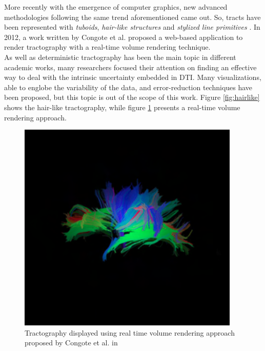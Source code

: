 \documentclass{article}
\begin{document}
\begin{multicols}{2}
More recently with the emergence of computer graphics, new advanced methodologies following the same trend aforementioned came out. So, tracts have been represented with \textit{tuboids}\cite{petrovic2007visualizing}, \textit{hair-like structures} \cite{peeters2006visualization} and \textit{stylized line primitives} \cite{stoll2005visualization}. In 2012, a work written by Congote et al. proposed a web-based application to render tractography \cite{congote2012real} with a real-time volume rendering technique. \\
As well as deterministic tractography has been the main topic in different academic works, many researchers focused their attention on finding an effective way to deal with the intrinsic uncertainty embedded in DTI. Many visualizations, able to englobe the variability of the data, and error-reduction techniques have been proposed, but this topic is out of the scope of this work. Figure \ref{fig:hairlike} shows the hair-like tractography, while figure \ref{gig:realtime} presents a real-time volume rendering approach.


\begin{figure}[H]
\centering
\includegraphics[width = 0.8\columnwidth]{realTimeTractography}
\caption{Tractography displayed using real time volume rendering approach proposed by Congote et al. in \cite{congote2012real}}
\label{gig:realtime}
\end{figure}



\end{multicols}
\end{document}

